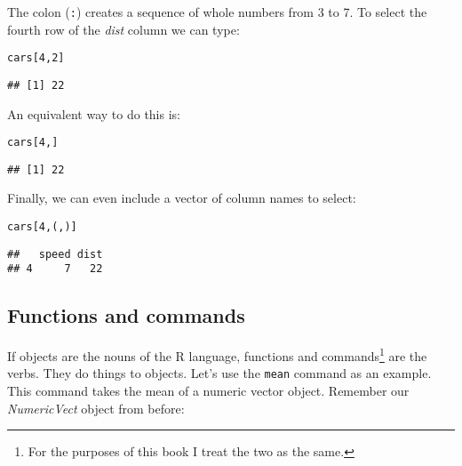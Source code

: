 \noindent The colon (\texttt{:}) creates a sequence of whole numbers from 3 to 7. To select the fourth row of the {\emph{dist}} column we can type:

\begin{knitrout}
\color{fgcolor}\begin{kframe}
\begin{alltt}
cars[4, 2]
\end{alltt}
\begin{verbatim}
## [1] 22
\end{verbatim}
\end{kframe}
\end{knitrout}


\noindent An equivalent way to do this is:

\begin{knitrout}
\color{fgcolor}\begin{kframe}
\begin{alltt}
cars[4, ]
\end{alltt}
\begin{verbatim}
## [1] 22
\end{verbatim}
\end{kframe}
\end{knitrout}


\noindent Finally, we can even include a vector of column names to select:

\begin{knitrout}
\color{fgcolor}\begin{kframe}
\begin{alltt}
cars[4, (, )]
\end{alltt}
\begin{verbatim}
##   speed dist
## 4     7   22
\end{verbatim}
\end{kframe}
\end{knitrout}


\subsection{Functions and commands}

If objects are the nouns of the R language, functions and commands\footnote{For the purposes of this book I treat the two as the same.} are the verbs. They do things to objects. Let's use the \texttt{mean} command as an example. This command takes the mean of a numeric vector object. Remember our {\emph{NumericVect}} object from before:

